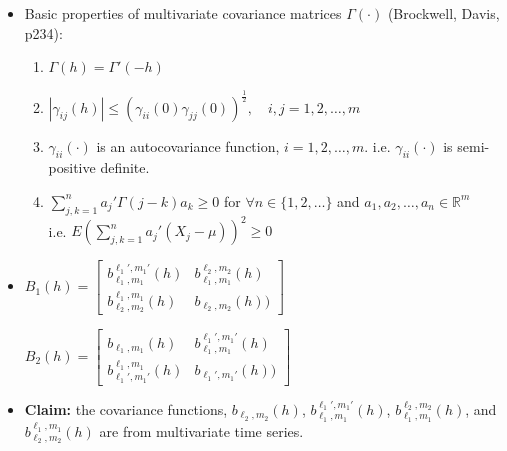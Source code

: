 \documentclass[11pt]{article}
\begin{document}
\begin{itemize}
\item Basic properties of multivariate covariance matrices $\Gamma(\cdot)$ (Brockwell, Davis, p234):\\
\begin{enumerate}
\item $\Gamma(h)=\Gamma'(-h)$
\item $|\gamma_{ij}(h)| \le (\gamma_{ii}(0) \gamma_{jj}(0))^{\frac{1}{2}}, \quad i,j=1,2,\dots, m$
\item $\gamma_{ii}(\cdot)$ is an autocovariance function, $i=1,2,\dots,m$.
i.e. $\gamma_{ii}(\cdot)$ is semi-positive definite.
\item $\sum_{j,k=1}^n a_j' \Gamma(j-k) a_k \ge 0$ for $\forall n \in \{1,2,\dots\}$ and $a_1,a_2,\dots,a_n \in \mathbb{R}^m$\\
i.e. $E(\sum_{j,k=1}^n a_j '(X_j-\mu))^2 \ge 0$\\
\end{enumerate}

\item
$B_1(h)= 
\begin{bmatrix}
b_{\ell_1,m_1}^{\ell_1',m_1'}(h) & b_{\ell_1,m_1}^{\ell_2,m_2}(h) \\ 
b_{\ell_2,m_2}^{\ell_1,m_1}(h) & b_{\ell_2,m_2}(h)) 
\end{bmatrix}$

$B_2(h)= 
\begin{bmatrix}
b_{\ell_1,m_1}(h) & b_{\ell_1,m_1}^{\ell_1',m_1'}(h) \\ 
b_{\ell_1',m_1'}^{\ell_1,m_1}(h) & b_{\ell_1',m_1'}(h)) 
\end{bmatrix}$

\item
\textbf{Claim:} the covariance functions, $b_{\ell_2,m_2}(h)$, $b_{\ell_1,m_1}^{\ell_1',m_1'}(h)$, $b_{\ell_1,m_1}^{\ell_2,m_2}(h)$, and $b_{\ell_2,m_2}^{\ell_1,m_1}(h)$ are from multivariate time series.\\


\end{itemize}
\end{document}
